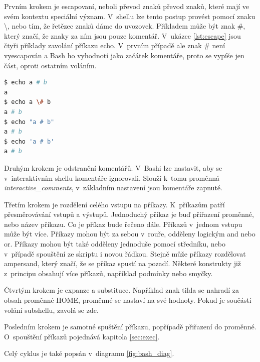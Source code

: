 \documentclass[thesis=M,czech]{FITthesis}[2012/06/26]
\begin{document}
Prvním krokem je escapovaní, neboli převod znaků převod znaků, které mají ve svém kontextu speciální význam. V~shellu lze tento postup provést pomocí znaku \textbackslash, nebo tím, že řetězec znaků dáme do uvozovek. Příkladem může být znak \#, který značí, že znaky za ním jsou pouze komentář. V~ukázce \ref{lst:escape} jsou čtyři příklady zavolání příkazu echo. V~prvním případě ale znak \# není vyescapován a Bash ho vyhodnotí jako začátek komentáře, proto se vypíše jen část, oproti ostatním voláním.

\begin{minipage}{\linewidth}
\begin{lstlisting}[language=bash, caption={Escapovaní v~shellu}, label={lst:escape}]
$ echo a # b
a
$ echo a \# b
a # b
$ echo "a # b"
a # b
$ echo 'a # b'
a # b
\end{lstlisting}
\end{minipage}

Druhým krokem je odstranění komentářů. V~Bashi lze nastavit, aby se v~interaktivním shellu komentáře ignorovali. Slouží k~tomu proměnná \textit{interactive\_comments}, v~základním nastavení jsou komentáře zapnuté.

Třetím krokem je rozdělení celého vstupu na příkazy. K~příkazům patří přesměrovávání vstupů a výstupů. Jednoduchý příkaz je buď přiřazení proměnné, nebo název příkazu. Co je příkaz bude řečeno dále. Příkazů v~jednom vstupu může být více. Příkazy mohou být za sebou v~rouře, odděleny logickým and nebo or. Příkazy mohou být také odděleny jednoduše pomocí středníku, nebo v~případě spouštění ze skriptu i novou řádkou. Stejně může příkazy rozdělovat ampersand, který značí,  že se příkaz spustí na pozadí. Některé konstrukty již z~principu obsahují více příkazů, například podmínky nebo smyčky.

Čtvrtým krokem je expanze a substituce. Například znak tilda se nahradí za obsah proměnné HOME, proměnné se nastaví na své hodnoty. Pokud je součástí volání subshellu, zavolá se zde.

Posledním  krokem je samotné spuštění příkazu, popřípadě přiřazení do proměnné. O~spouštění příkazů pojednává kapitola \ref{sec:exec}.

Celý cyklus je také popsán v~diagramu \ref{fig:bash_diag}.
\end{document}
